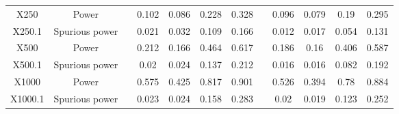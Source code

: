 % 
\begin{tabular}{cccccccccccc}
  \hline
  \hline
X250 & Power &  & 0.102 & 0.086 & 0.228 & 0.328 &  & 0.096 & 0.079 & 0.19 & 0.295 \\ 
  X250.1 & Spurious power &  & 0.021 & 0.032 & 0.109 & 0.166 &  & 0.012 & 0.017 & 0.054 & 0.131 \\ 
  X500 & Power &  & 0.212 & 0.166 & 0.464 & 0.617 &  & 0.186 & 0.16 & 0.406 & 0.587 \\ 
  X500.1 & Spurious power &  & 0.02 & 0.024 & 0.137 & 0.212 &  & 0.016 & 0.016 & 0.082 & 0.192 \\ 
  X1000 & Power &  & 0.575 & 0.425 & 0.817 & 0.901 &  & 0.526 & 0.394 & 0.78 & 0.884 \\ 
  X1000.1 & Spurious power &  & 0.023 & 0.024 & 0.158 & 0.283 &  & 0.02 & 0.019 & 0.123 & 0.252 \\ 
   \hline
\end{tabular}
